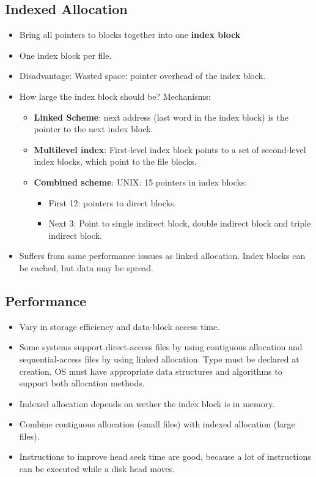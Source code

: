 \documentclass[10pt]{report}
\begin{document}
		\subsection{Indexed Allocation}
			\begin{itemize}
				\item Bring all pointers to blocks together into one \textbf{index block}
				\item One index block per file.
				\item Disadvantage: Wasted space: pointer overhead of the index block.
				\item How large the index block should be? Mechanisms:
				\begin{itemize}
					\item \textbf{Linked Scheme}: next address (last word in the index block) is the pointer to the next index block.
					\item \textbf{Multilevel index}: First-level index block points to a set of second-level index blocks, which point to the file blocks.
					\item \textbf{Combined scheme}: UNIX: 15 pointers in index blocks:
					\begin{itemize}
						\item First 12: pointers to direct blocks.
						\item Next 3: Point to single indirect block, double indirect block and triple indirect block.
					\end{itemize}
				\end{itemize}
				\item Suffers from same performance isssues as linked allocation. Index blocks can be cached, but data may be spread.
			\end{itemize}


		\subsection{Performance}
			\begin{itemize}
				\item Vary in storage efficiency and data-block access time.
				\item Some systems support direct-access files by using contiguous allocation and sequential-access files by using linked allocation. Type must be declared at creation. OS must have appropriate data structures and algorithms to support both allocation methods.
				\item Indexed allocation depends on wether the index block is in memory.
				\item Combine contiguous allocation (small files) with indexed allocation (large files).
				\item Instructions to improve head seek time are good, because a lot of instructions can be executed while a disk head moves.
			\end{itemize}
\end{document}
